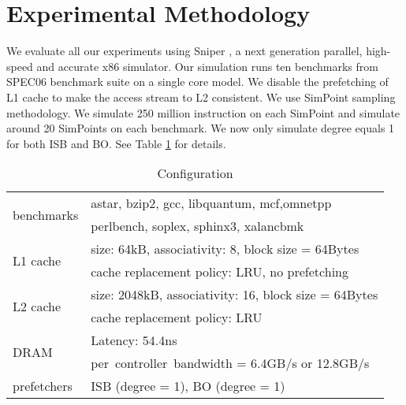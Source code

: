 \section{Experimental Methodology}
\label{sec:methodology}

We evaluate all our experiments using Sniper \cite{sniperpaper}, a next generation parallel, high-speed and accurate x86 simulator. Our simulation runs ten benchmarks from SPEC06 benchmark suite on a single core model. We disable the prefetching of L1 cache to make the access stream to L2 consistent. We use SimPoint sampling methodology. We simulate 250 million instruction on each SimPoint and simulate around 20 SimPoints on each benchmark. We now only simulate degree equals 1 for both ISB and BO. See Table \ref{table:config} for details. 
\begin{table}[ht!]
\centering
        \renewcommand{\multirowsetup}{\centering}  
        \begin{tabular}{|l|l|} 
        \hline  
        \multirow{2}{3cm}{benchmarks}   & {astar, bzip2, gcc, libquantum, mcf,omnetpp} \\
         \multirow{2}{3cm}{}  & {perlbench, soplex, sphinx3, xalancbmk} \\ \cline{1-2}
         \multirow{2}{3cm}{L1 cache}  & {size: 64kB, associativity: 8, block size = 64Bytes} \\
         \multirow{2}{3cm}{}  & {cache replacement policy: LRU, no prefetching} \\ \cline{1-2}
         \multirow{2}{3cm}{L2 cache}  & {size: 2048kB, associativity: 16, block size = 64Bytes} \\
         \multirow{2}{3cm}{}  & {cache replacement policy: LRU} \\ \cline{1-2}
         \multirow{2}{3cm}{DRAM }  
         	& {Latency: 54.4ns } \\ 
	 \multirow{1}{3cm}{}  & {per\ controller\ bandwidth = 6.4GB/s or 12.8GB/s} \\ \cline{1-2}
         \multirow{1}{3cm}{prefetchers}  & {ISB (degree = 1), BO (degree = 1)} \\ \cline{1-2}
        \hline 
        \end{tabular} 
\caption{Configuration}
\label{table:config}
\end{table}



